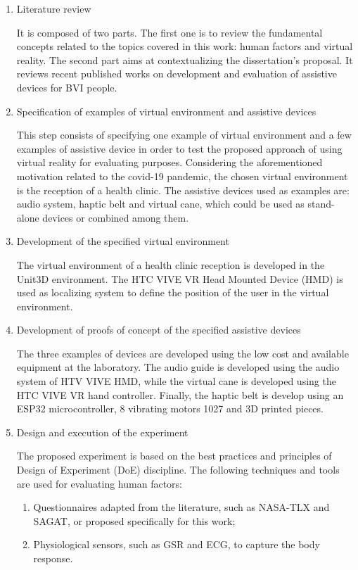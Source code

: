 \begin{enumerate}[label = Step \arabic* -- ]
    \item Literature review 
    
    It is composed of two parts. The first one is to review the fundamental concepts related to the topics covered in this work: human factors and virtual reality. The second part aims at contextualizing the dissertation’s proposal. It reviews recent published works on development and evaluation of assistive devices for BVI people.
    
    \item Specification of examples of virtual environment and assistive devices

    This step consists of specifying one example of virtual environment and a few examples of assistive device in order to test the proposed approach of using virtual reality for evaluating purposes. Considering the aforementioned motivation related to the covid-19 pandemic, the chosen virtual environment is the reception of a health clinic. The assistive devices used as examples are: audio system, haptic belt and virtual cane, which could be used as stand-alone devices or combined among them.
    
    \item Development of the specified virtual environment
    
    The virtual environment of a health clinic reception is developed in the Unit3D environment. The HTC VIVE VR Head Mounted Device (HMD) is used as localizing system to define the position of the user in the virtual environment.
    
    \item Development of proofs of concept of the specified assistive devices
    
    The three examples of devices are developed using the low cost and available equipment at the laboratory. The audio guide is developed using the audio system of HTV VIVE HMD, while the virtual cane is developed using the HTC VIVE VR hand controller. Finally, the haptic belt is develop using an ESP32 microcontroller, 8 vibrating motors 1027 and 3D printed pieces.
    
    \item Design and execution of the experiment
    
    The proposed experiment is based on the best practices and principles of Design of Experiment (DoE) discipline.
    The following techniques and tools are used for evaluating human factors:
    \begin{enumerate}[label = \alph*)]
        \item Questionnaires adapted from the literature, such as NASA-TLX and SAGAT, or proposed specifically for this work;
        \item Physiological sensors, such as GSR and ECG, to capture the body response.
    \end{enumerate}
    

\end{enumerate}
